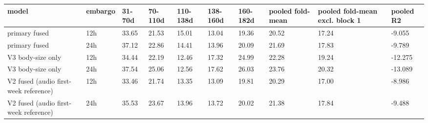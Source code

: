 \begin{tabular}{llllllllll}
\hline
model & embargo & 31-70d & 70-110d & 110-138d & 138-160d & 160-182d & pooled fold-mean & pooled fold-mean excl. block 1 & pooled R2 \\
\hline
primary fused & 12h & 33.65 & 21.53 & 15.01 & 13.04 & 19.36 & 20.52 & 17.24 & -9.055 \\
primary fused & 24h & 37.12 & 22.86 & 14.41 & 13.96 & 20.09 & 21.69 & 17.83 & -9.789 \\
V3 body-size only & 12h & 34.44 & 22.19 & 12.46 & 17.32 & 24.99 & 22.28 & 19.24 & -12.275 \\
V3 body-size only & 24h & 37.54 & 25.06 & 12.56 & 17.62 & 26.03 & 23.76 & 20.32 & -13.089 \\
V2 fused (audio first-week reference) & 12h & 33.46 & 21.74 & 13.35 & 13.09 & 19.81 & 20.29 & 17.00 & -8.986 \\
V2 fused (audio first-week reference) & 24h & 35.53 & 23.67 & 13.96 & 13.72 & 20.02 & 21.38 & 17.84 & -9.488 \\
\hline
\end{tabular}
